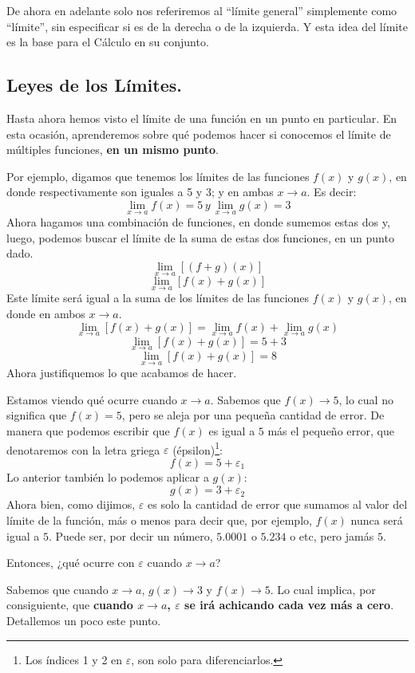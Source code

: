 \documentclass[12pt]{article}
\begin{document}
De ahora en adelante solo nos referiremos al ``límite general'' simplemente como ``límite'', sin especificar si es de la derecha o de la izquierda. Y esta idea del límite es la base para el Cálculo en su conjunto.


\subsection{Leyes de los Límites.}

Hasta ahora hemos visto el límite de una función en un punto en particular. En esta ocasión, aprenderemos sobre qué podemos hacer si conocemos el límite de múltiples funciones, \textbf{en un mismo punto}.

Por ejemplo, digamos que tenemos los límites de las funciones $f(x)$ y $g(x)$, en donde respectivamente son iguales a 5 y 3; y en ambas $x \to a$. Es decir:
\[\lim_{x \to a}f(x)=5 \, y \, \lim_{x \to a} g(x) = 3\]
Ahora hagamos una combinación de funciones, en donde sumemos estas dos y, luego, podemos buscar el límite de la suma de estas dos funciones, en un punto dado.
\[\lim_{x \to a}[(f + g)(x)]\]
\[\lim_{x \to a}[f(x) + g(x)]\]
Este límite será igual a la suma de los límites de las funciones $f(x)$ y $g(x)$, en donde en ambos $x \to a$.
\[\lim_{x \to a}[f(x) + g(x)] = \lim_{x \to a}f(x) + \lim_{x \to a}g(x)\]
\[\lim_{x \to a}[f(x) + g(x)] = 5 + 3\]
\[\lim_{x \to a}[f(x) + g(x)] = 8\]
Ahora justifiquemos lo que acabamos de hacer. 

Estamos viendo qué ocurre cuando $x \to a$. Sabemos que $f(x) \to 5$, lo cual no significa que $f(x) = 5$, pero se aleja por una pequeña cantidad de error. De manera que podemos escribir que $f(x)$ es igual a $5$ más el pequeño error, que denotaremos con la letra griega $\varepsilon$ (épsilon)\footnote{Los índices 1 y 2 en $\varepsilon$, son solo para diferenciarlos.}:
\[f(x) = 5 + \varepsilon_{1}\]
Lo anterior también lo podemos aplicar a $g(x)$:
\[g(x) = 3 + \varepsilon_{2}\]
Ahora bien, como dijimos, $\varepsilon$ es solo la cantidad de error que sumamos al valor del límite de la función, más o menos para decir que, por ejemplo, $f(x)$ nunca será igual a $5$. Puede ser, por decir un número, $5.0001$ o $5.234$ o etc, pero jamás $5$.

Entonces, ¿qué ocurre con $\varepsilon$ cuando $x \to a$?

Sabemos que cuando $x \to a$, $g(x) \to 3$ y $f(x) \to 5$. Lo cual implica, por consiguiente, que \textbf{cuando $x \to a$, $\varepsilon$ se irá achicando cada vez más a cero}. Detallemos un poco este punto.
\end{document}
